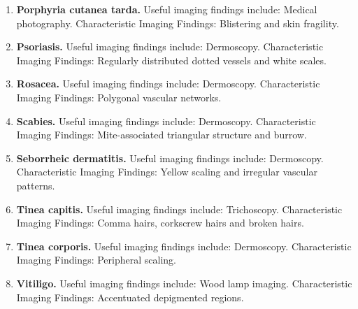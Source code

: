 \begin{enumerate}[leftmargin=*,itemsep=0.45em,topsep=0.4em]
\item \textbf{Porphyria cutanea tarda.} Useful imaging findings include: Medical photography. Characteristic Imaging Findings: Blistering and skin fragility.
\item \textbf{Psoriasis.} Useful imaging findings include: Dermoscopy. Characteristic Imaging Findings: Regularly distributed dotted vessels and white scales.
\item \textbf{Rosacea.} Useful imaging findings include: Dermoscopy. Characteristic Imaging Findings: Polygonal vascular networks.
\item \textbf{Scabies.} Useful imaging findings include: Dermoscopy. Characteristic Imaging Findings: Mite-associated triangular structure and burrow.
\item \textbf{Seborrheic dermatitis.} Useful imaging findings include: Dermoscopy. Characteristic Imaging Findings: Yellow scaling and irregular vascular patterns.
\item \textbf{Tinea capitis.} Useful imaging findings include: Trichoscopy. Characteristic Imaging Findings: Comma hairs, corkscrew hairs and broken hairs.
\item \textbf{Tinea corporis.} Useful imaging findings include: Dermoscopy. Characteristic Imaging Findings: Peripheral scaling.
\item \textbf{Vitiligo.} Useful imaging findings include: Wood lamp imaging. Characteristic Imaging Findings: Accentuated depigmented regions.
\end{enumerate}

